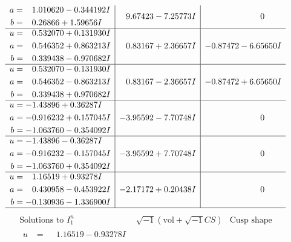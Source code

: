 \documentclass[1p]{elsarticle_modified}
\theoremstyle{definition}
\newcommand{\I}{\sqrt{-1}}
\begin{document}
$$\begin{array}{c|c|c}
\begin{aligned}
a &= \phantom{-}1.010620 - 0.344192 I \\
b &= \phantom{-}0.26866 + 1.59656 I\end{aligned}
 & \phantom{-}9.67423 - 7.25773 I & \phantom{-0.000000 } 0 \\ \hline\begin{aligned}
u &= \phantom{-}0.532070 + 0.131930 I \\
a &= \phantom{-}0.546352 + 0.863213 I \\
b &= \phantom{-}0.339438 - 0.970682 I\end{aligned}
 & \phantom{-}0.83167 + 2.36657 I & -0.87472 - 6.65650 I \\ \hline\begin{aligned}
u &= \phantom{-}0.532070 - 0.131930 I \\
a &= \phantom{-}0.546352 - 0.863213 I \\
b &= \phantom{-}0.339438 + 0.970682 I\end{aligned}
 & \phantom{-}0.83167 - 2.36657 I & -0.87472 + 6.65650 I \\ \hline\begin{aligned}
u &= -1.43896 + 0.36287 I \\
a &= -0.916232 + 0.157045 I \\
b &= -1.063760 - 0.354092 I\end{aligned}
 & -3.95592 - 7.70748 I & \phantom{-0.000000 } 0 \\ \hline\begin{aligned}
u &= -1.43896 - 0.36287 I \\
a &= -0.916232 - 0.157045 I \\
b &= -1.063760 + 0.354092 I\end{aligned}
 & -3.95592 + 7.70748 I & \phantom{-0.000000 } 0 \\ \hline\begin{aligned}
u &= \phantom{-}1.16519 + 0.93278 I \\
a &= \phantom{-}0.430958 - 0.453922 I \\
b &= -0.130936 - 1.336900 I\end{aligned}
 & -2.17172 + 0.20438 I & \phantom{-0.000000 } 0\\
 \hline 
 \end{array}$$\newpage$$\begin{array}{c|c|c}  
\text{Solutions to }I^u_{1}& \I (\text{vol} + \sqrt{-1}CS) & \text{Cusp shape}\\
 \hline 
\begin{aligned}
u &= \phantom{-}1.16519 - 0.93278 I \\

\end{aligned}
\end{array}$$
\end{document}
